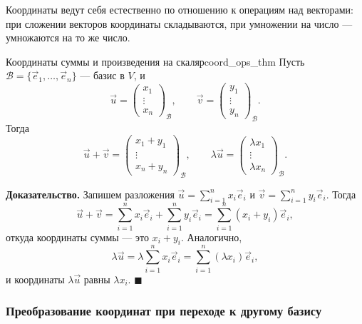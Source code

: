 \documentclass[12pt,a4paper]{article}
\newenvironment{myproof}{\noindent\textbf{Доказательство.}}{\hfill$\blacksquare$}
\begin{document}
Координаты ведут себя естественно по отношению к операциям над
векторами: при сложении векторов координаты складываются, при умножении
на число --- умножаются на то же число.

\begin{theorem}{Координаты суммы и произведения на
  скаляр}{coord_ops_thm}
  Пусть $\mathcal{B} = \{\vec{e}_1, \dots, \vec{e}_n\}$ --- базис в
  $V$, и
  \[
    \vec{u} =
    \begin{pmatrix} x_1 \\ \vdots \\ x_n
    \end{pmatrix}_{\mathcal{B}},
    \qquad
    \vec{v} =
    \begin{pmatrix} y_1 \\ \vdots \\ y_n
    \end{pmatrix}_{\mathcal{B}}.
  \]
  Тогда
  \[
    \vec{u} + \vec{v} =
    \begin{pmatrix} x_1 + y_1 \\ \vdots \\ x_n + y_n
    \end{pmatrix}_{\mathcal{B}},
    \qquad
    \lambda\vec{u} =
    \begin{pmatrix} \lambda x_1 \\ \vdots \\ \lambda x_n
    \end{pmatrix}_{\mathcal{B}}.
  \]
\end{theorem}

\begin{myproof}
  Запишем разложения $\vec{u} = \sum_{i=1}^{n} x_i \vec{e}_i$ и
  $\vec{v} = \sum_{i=1}^{n} y_i \vec{e}_i$. Тогда
  \[
    \vec{u} + \vec{v} = \sum_{i=1}^{n} x_i \vec{e}_i +
    \sum_{i=1}^{n} y_i \vec{e}_i = \sum_{i=1}^{n} (x_i + y_i)\vec{e}_i,
  \]
  откуда координаты суммы --- это $x_i + y_i$. Аналогично,
  \[
    \lambda\vec{u} = \lambda\sum_{i=1}^{n} x_i \vec{e}_i =
    \sum_{i=1}^{n} (\lambda x_i)\vec{e}_i,
  \]
  и координаты $\lambda\vec{u}$ равны $\lambda x_i$.
\end{myproof}

\subsubsection*{Преобразование координат при переходе к другому базису}
\end{document}
